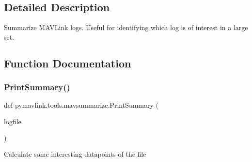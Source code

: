 \subsection{Detailed Description}
\begin{DoxyVerb}Summarize MAVLink logs. Useful for identifying which log is of interest in a large set.
\end{DoxyVerb}
 

\subsection{Function Documentation}
\mbox{\label{namespacepymavlink_1_1tools_1_1mavsummarize_a18c485920e60829977222cc4c514c590}} 
\subsubsection{\texorpdfstring{Print\+Summary()}{PrintSummary()}}
{\footnotesize\ttfamily def pymavlink.\+tools.\+mavsummarize.\+Print\+Summary (\begin{DoxyParamCaption}\item[{}]{logfile }\end{DoxyParamCaption})}

\begin{DoxyVerb}Calculate some interesting datapoints of the file\end{DoxyVerb}
 